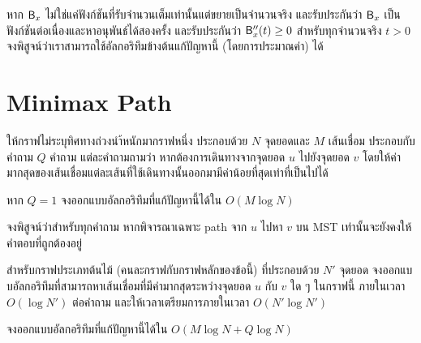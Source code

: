 \begin{bonus}
หาก $\mathsf{B}_x$ ไม่ใช่แค่ฟังก์ชันที่รับจำนวนเต็มเท่านั้นแต่ขยายเป็นจำนวนจริง และรับประกันว่า $\mathsf{B}_x$ เป็นฟังก์ชันต่อเนื่องและหาอนุพันธ์ได้สองครั้ง และรับประกันว่า $\mathsf{B}_x''(t) \geq 0$ สำหรับทุกจำนวนจริง $t > 0$ จงพิสูจน์ว่าเราสามารถใช้อัลกอริทึมข้างต้นแก้ปัญหานี้ (โดยการประมาณค่า) ได้
\end{bonus}

\section{Minimax Path}

ให้กราฟไม่ระบุทิศทางถ่วงนำ้หนักมากราฟหนึ่ง ประกอบด้วย $N$ จุดยอดและ $M$ เส้นเชื่อม ประกอบกับคำถาม $Q$ คำถาม แต่ละคำถามถามว่า หากต้องการเดินทางจากจุดยอด $u$ ไปยังจุดยอด $v$ โดยให้ค่ามากสุดของเส้นเชื่อมแต่ละเส้นที่ใช้เดินทางนั้นออกมามีค่าน้อยที่สุดเท่าที่เป็นไปได้

\begin{exercise}
หาก $Q = 1$ จงออกแบบอัลกอริทึมที่แก้ปัญหานี้ได้ใน $O(M \log N)$
\end{exercise}

\begin{exercise}
จงพิสูจน์ว่าสำหรับทุกคำถาม หากพิจารณาเฉพาะ path จาก $u$ ไปหา $v$ บน MST เท่านั้นจะยังคงให้คำตอบที่ถูกต้องอยู่
\end{exercise}

\begin{exercise}
สำหรับกราฟประเภทต้นไม้ (คนละกราฟกับกราฟหลักของข้อนี้) ที่ประกอบด้วย $N'$ จุดยอด จงออกแบบอัลกอริทึมที่สามารถหาเส้นเชื่อมที่มีค่ามากสุดระหว่างจุดยอด $u$ กับ $v$ ใด ๆ ในกราฟนี้ ภายในเวลา $O(\log N')$ ต่อคำถาม และให้เวลาเตรียมการภายในเวลา $O(N' \log N')$
\end{exercise}

\begin{exercise}
จงออกแบบอัลกอริทึมที่แก้ปัญหานี้ได้ใน $O(M \log N + Q \log N)$
\end{exercise}